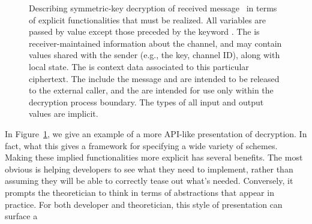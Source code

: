\begin{figure}[t]
  \begin{center}
  \end{center}
%
\caption{Describing symmetric-key decryption of received message~ in terms of
  explicit functionalities that must be realized. All variables are passed by
  value except those preceded by the keyword . The
   is receiver-maintained information about the channel,
  and may contain values shared with the sender (e.g., the key, channel ID),
  along with local state.  The  is context data associated
  to this particular ciphertext. The  include the message
  and are intended to be released to the external caller, and the
   are intended for use only within the decryption process
  boundary.  The types of all input and output values are implicit.}
\label{fig:syntax-api-example}
\end{figure}
%
In Figure~\ref{fig:syntax-api-example}, we give an example of a more
API-like presentation of decryption.  In fact, what this gives a
framework for specifying a wide variety of schemes.
%
Making these implied functionalities more explicit has several benefits.  The
most obvious is helping developers to see what they need to implement, rather
than assuming they will be able to correctly tease out what's needed.
Conversely, it prompts the theoretician to think in terms of abstractions that
appear in practice.
%
For both developer and theoretician, this style of presentation can surface a
